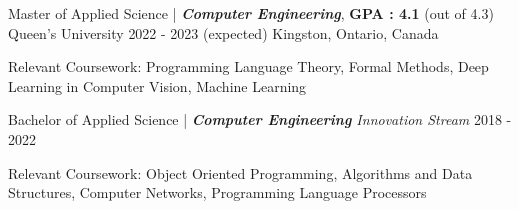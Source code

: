 

\begin{cventries}

  \cventry
    {Master of Applied Science | \textit{\textbf{Computer Engineering}}, \textbf{GPA : 4.1} (out of 4.3)} %
    {Queen's University} %
    {2022 - 2023 (expected)} %
    {Kingston, Ontario, Canada} %
    {
    \begin{cvitems} %
        \item {Relevant Coursework: Programming Language Theory, Formal Methods, Deep Learning in Computer Vision, Machine Learning}
      \end{cvitems}
    }
  \cventry
    {Bachelor of Applied Science | \textit{\textbf{Computer Engineering} Innovation Stream}} %
    {} %
    {2018 - 2022} %
    {} %
    {
    \begin{cvitems} %
        \item {Relevant Coursework: Object Oriented Programming, Algorithms and Data Structures, Computer Networks, Programming Language Processors}
      \end{cvitems}
    }
    \cventry{}{}{}{}{}
\end{cventries}
